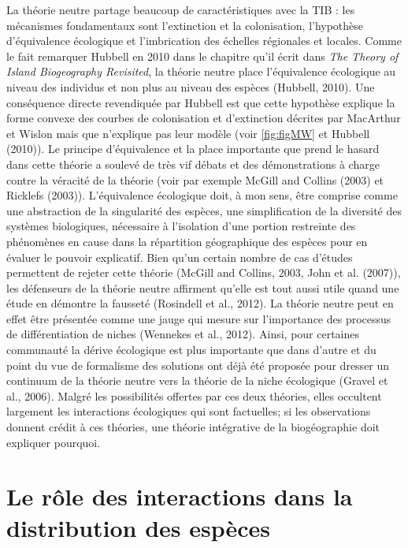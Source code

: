 La théorie neutre partage beaucoup de caractéristiques avec la TIB : les
mécanismes fondamentaux sont l'extinction et la colonisation,
l'hypothèse d'équivalence écologique et l'imbrication des échelles
régionales et locales. Comme le fait remarquer Hubbell en 2010 dans le
chapitre qu'il écrit dans \emph{The Theory of Island Biogeography
Revisited}, la théorie neutre place l'équivalence écologique au niveau
des individus et non plus au niveau des espèces (Hubbell, 2010). Une
conséquence directe revendiquée par Hubbell est que cette hypothèse
explique la forme convexe des courbes de colonisation et d'extinction
décrites par MacArthur et Wislon mais que n'explique pas leur modèle
(voir \ref{fig:figMW} et Hubbell (2010)). Le principe d'équivalence et
la place importante que prend le hasard dans cette théorie a soulevé de
très vif débats et des démonstrations à charge contre la véracité de la
théorie (voir par exemple McGill and Collins (2003) et Ricklefs (2003)).
L'équivalence écologique doit, à mon sens, être comprise comme une
abstraction de la singularité des espèces, une simplification de la
diversité des systèmes biologiques, nécessaire à l'isolation d'une
portion restreinte des phénomènes en cause dans la répartition
géographique des espèces pour en évaluer le pouvoir explicatif. Bien
qu'un certain nombre de cas d'études permettent de rejeter cette théorie
(McGill and Collins, 2003, John et al. (2007)), les défenseurs de la
théorie neutre affirment qu'elle est tout aussi utile quand une étude en
démontre la fausseté (Rosindell et al., 2012). La théorie neutre peut en
effet être présentée comme une jauge qui mesure sur l'importance des
processus de différentiation de niches (Wennekes et al., 2012). Ainsi,
pour certaines communauté la dérive écologique est plus importante que
dans d'autre et du point du vue de formalisme des solutions ont déjà été
proposée pour dresser un continuum de la théorie neutre vers la théorie
de la niche écologique (Gravel et al., 2006). Malgré les possibilités
offertes par ces deux théories, elles occultent largement les
interactions écologiques qui sont factuelles; si les observations
donnent crédit à ces théories, une théorie intégrative de la
biogéographie doit expliquer pourquoi.

\section*{Le rôle des interactions dans la distribution des
espèces}\label{le-ruxf4le-des-interactions-dans-la-distribution-des-espuxe8ces}

